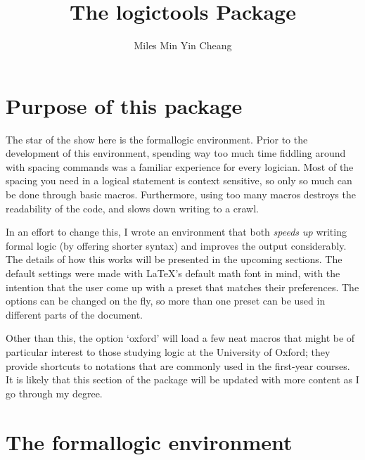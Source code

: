 \documentclass{article}
\title{The logictools Package}
\author{Miles Min Yin Cheang}
\begin{document}
\maketitle
{}
\tableofcontents
\newpage

\section{Purpose of this package}
The star of the show here is the formallogic environment. Prior to the development of this environment, spending way too much time fiddling around with spacing commands was a familiar experience for every logician. Most of the spacing you need in a logical statement is context sensitive, so only so much can be done through basic macros. Furthermore, using too many macros destroys the readability of the code, and slows down writing to a crawl.

In an effort to change this, I wrote an environment that both \emph{speeds up} writing formal logic (by offering shorter syntax) and improves the output considerably. The details of how this works will be presented in the upcoming sections. The default settings were made with \LaTeX's default math font in mind, with the intention that the user come up with a preset that matches their preferences. The options can be changed on the fly, so more than one preset can be used in different parts of the document.

Other than this, the option `oxford' will load a few neat macros that might be of particular interest to those studying logic at the University of Oxford; they provide shortcuts to notations that are commonly used in the first-year courses. It is likely that this section of the package will be updated with more content as I go through my degree.
\newpage
\section{The formallogic environment}
\end{document}

